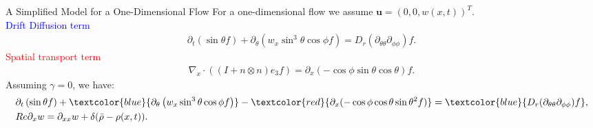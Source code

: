 \begin{frame}{A Simplified Model for a One-Dimensional Flow}
	\scriptsize
For a one-dimensional flow we assume $	\boldsymbol{u} = (0,0,w(x,t))^T$. \\
\vspace{5mm}
\textcolor{blue}{Drift Diffusion term} 
    \begin{align*}
	\partial_{t}\left(\sin \theta f\right)+ \partial_\theta\left(w_x \sin ^3 \theta \cos \phi f\right)
	=D_{r}(\partial_{\theta\theta}\partial_{\phi\phi})f.
    \end{align*}
\textcolor{red}{Spatial transport term}
   \begin{align*}
   	\nabla_x \cdot ((I+n \otimes n)e_3f) =\partial_x( -\cos\phi \sin\theta \cos\theta)f.
   \end{align*}
 	Assuming $\gamma = 0$, we have:
 \begin{align*}
 	&\partial_{t}\left(\sin \theta f\right)+ \textcolor{blue}{\partial_\theta\left(w_x \sin ^3 \theta \cos \phi f\right)} - \textcolor{red}{\partial_x(-\cos\phi  \cos\theta \sin\theta^2f)}
 	= \textcolor{blue}{D_{r}(\partial_{\theta\theta}\partial_{\phi\phi})f}, \\
 	&Re\partial_{x}w = \partial_{xx}w + \delta(\bar{\rho}-\rho(x,t)).
 \end{align*}
\end{frame}


